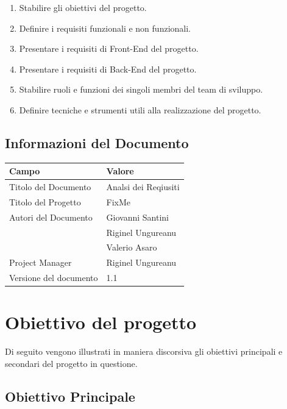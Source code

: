 \documentclass{report}
\begin{document}
\begin{enumerate}
		
	\item Stabilire gli obiettivi del progetto.
	\item Definire i requisiti funzionali e non funzionali.
	\item Presentare i requisiti di Front-End del progetto.
	\item Presentare i requisiti di Back-End del progetto.
	\item Stabilire ruoli e funzioni dei singoli membri del team di sviluppo.
	\item Definire tecniche e strumenti utili alla realizzazione del progetto.

\end{enumerate}


\section{Informazioni del Documento}

\begin{center} %
	\centering
	\begin{tabular}{ |p{4cm}|p{4cm}|  }
		\hline
		\centering Campo & \qquad\qquad Valore \\ %
		\hline
		Titolo del Documento & Analsi dei Reqiusiti \\
		\hline
		Titolo del Progetto & FixMe \\
		\hline
		Autori del Documento &
		Giovanni Santini \\ & Riginel Ungureanu \\ & Valerio Asaro \\
		\hline
		Project Manager & Riginel Ungureanu\\
		\hline
		Versione del documento & 1.1 \\
		\hline
	\end{tabular}
\end{center}

\chapter{Obiettivo del progetto}

Di seguito vengono illustrati in maniera discorsiva gli obiettivi principali e secondari del progetto in questione.

\section{Obiettivo Principale}
\end{document}

